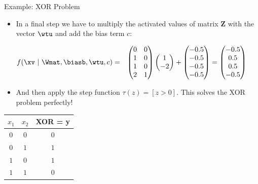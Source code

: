 \begin{vbframe}{Example: XOR Problem}
{\framebreak
  \begin{itemize}
    \item In a final step we have to multiply the activated values of matrix $\bm{Z}$ with the vector $\wtu$ and add the bias term $c$:
  \end{itemize}
  \begin{eqnarray*}
    f(\xv ~|~ \Wmat, \biasb, \wtu, c) &=&
    \begin{pmatrix}
      0 & 0 \\
      1 & 0 \\
      1 & 0 \\
      2 & 1
    \end{pmatrix}
    \begin{pmatrix}
      1 \\
      -2
    \end{pmatrix} + 
    \begin{pmatrix}
      - 0.5 \\
      - 0.5 \\
      - 0.5 \\
      - 0.5
    \end{pmatrix}
    =
    \begin{pmatrix}
      - 0.5 \\
      0.5 \\
      0.5 \\
      - 0.5
    \end{pmatrix}
  \end{eqnarray*}
  \begin{itemize}
    \item And then apply the step function $\tau(z) = [z > 0 ]$.  This solves the XOR problem perfectly!
  \end{itemize}
  \begin{table}
    \centering
      \begin{tabular}{ccc}
        \textbf{$x_1$}  & \textbf{$x_2$}  & \textbf{XOR} = y\\
        \hline
        \hline
        $0$             &   $0$           &  $0$ \\
        $0$             &   $1$           &  $1$ \\
        $1$             &   $0$           &  $1$ \\
        $1$             &   $1$           &  $0$
      \end{tabular}
  \end{table}
  }
\end{vbframe}



